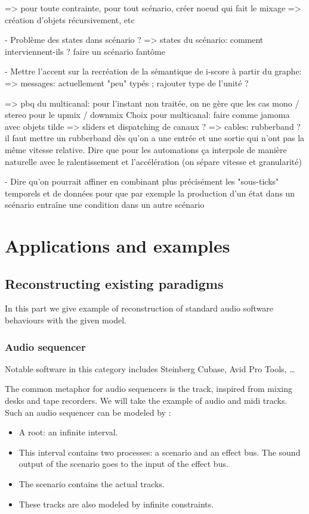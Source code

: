 \documentclass[applsci,article,submit,moreauthors,pdftex,10pt,a4paper]{mdpi}
\begin{document}
=> pour toute contrainte, pour tout scénario, créer noeud qui fait le mixage
=> création d'objets récursivement, etc

- Problème des states dans scénario ?
=> states du scénario: comment interviennent-ils ? faire un scénario fantôme 


- Mettre l'accent sur la recréation de la sémantique de i-score à partir du graphe: 
=> messages: actuellement "peu" typés ; rajouter type de l'unité ? 

=> pbq du multicanal: pour l'instant non traitée, on ne gère que les cas mono / stereo pour le upmix / downmix
Choix pour multicanal: faire comme jamoma avec objets tilde
=> sliders et dispatching de canaux ?
=> cables: rubberband ? il faut mettre un rubberband dès qu'on a une entrée et une sortie qui n'ont pas la même vitesse relative. Dire que pour les automations ça interpole de manière naturelle avec le ralentissement et l'accélération (on sépare vitesse et granularité)


- Dire qu'on pourrait affiner en combinant plus précisément les "sous-ticks" temporels et de données
pour que par exemple la production d'un état dans un scénario entraîne une condition dans un autre scénario


\section{Applications and examples}

\subsection{Reconstructing existing paradigms}
In this part we give example of reconstruction of standard audio software behaviours with the given model.
\subsubsection{Audio sequencer}
Notable software in this category includes Steinberg Cubase, Avid Pro Tools, \dots

The common metaphor for audio sequencers is the track, inspired from mixing desks and tape recorders. 
We will take the example of audio and midi tracks. 
Such an audio sequencer can be modeled by : 

\begin{itemize}
    \item A root: an infinite interval.
    \item This interval contains two processes: a scenario and an effect bus. 
    The sound output of the scenario goes to the input of the effect bus.
    \item The scenario contains the actual tracks.
    \item These tracks are also modeled by infinite constraints.
\end{itemize}
\end{document}
